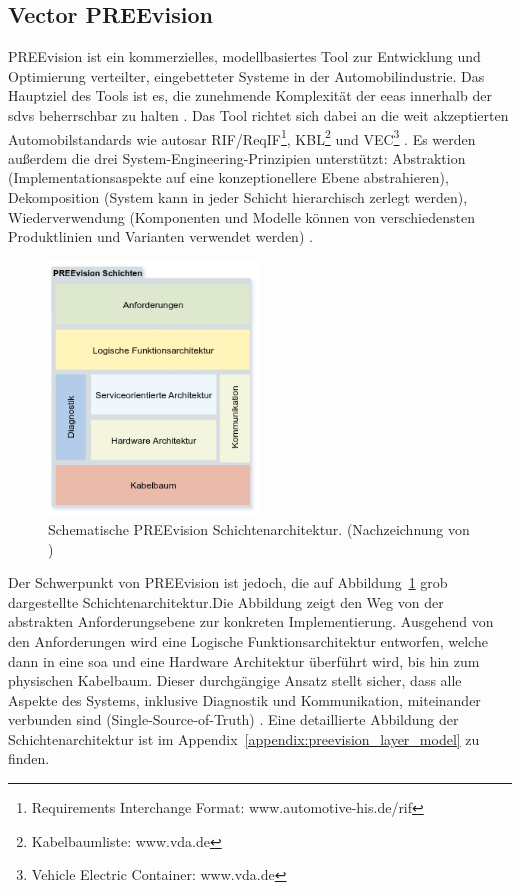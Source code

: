 \subsection{Vector PREEvision}
PREEvision ist ein kommerzielles, modellbasiertes Tool zur Entwicklung und Optimierung verteilter, eingebetteter Systeme in der Automobilindustrie. Das Hauptziel des Tools ist es, die zunehmende Komplexität der \glspl{eea} innerhalb der \glspl{sdv} beherrschbar zu halten \cite{askaripoor2022architecture}. Das  Tool richtet sich dabei an die weit akzeptierten Automobilstandards wie \gls{autosar} RIF/ReqIF\footnote{Requirements Interchange Format: www.automotive-his.de/rif}, KBL\footnote{Kabelbaumliste: www.vda.de
} und VEC\footnote{Vehicle Electric Container: www.vda.de} \cite{schauffele2016architectural}. Es werden außerdem die drei System-Engineering-Prinzipien unterstützt: Abstraktion (Implementationsaspekte auf eine konzeptionellere Ebene abstrahieren), Dekomposition (System kann in jeder Schicht hierarchisch zerlegt werden), Wiederverwendung (Komponenten und Modelle können von verschiedensten Produktlinien und Varianten verwendet werden) \cite{schauffele2016architectural}.

\begin{figure}[h!]
  \centering
  \includegraphics[width=0.5\textwidth]{figures/PREEVISION_LAYER.drawio.png}
  \caption{Schematische PREEvision Schichtenarchitektur. (Nachzeichnung von \cite{vectorinformatikgmbhpreevision})}
  \label{fig:preevision_schicht}
\end{figure}

Der Schwerpunkt von PREEvision ist jedoch, die auf Abbildung~\ref{fig:preevision_schicht} grob dargestellte Schichtenarchitektur.Die Abbildung zeigt den Weg von der abstrakten Anforderungsebene zur konkreten Implementierung. Ausgehend von den Anforderungen wird eine Logische Funktionsarchitektur entworfen, welche dann in eine \gls{soa} und eine Hardware Architektur überführt wird, bis hin zum physischen Kabelbaum. Dieser durchgängige Ansatz stellt sicher, dass alle Aspekte des Systems, inklusive Diagnostik und Kommunikation, miteinander verbunden sind (Single-Source-of-Truth) \cite{schauffele2016architectural}. Eine detaillierte Abbildung der Schichtenarchitektur ist im Appendix~\ref{appendix:preevision_layer_model} zu finden.


